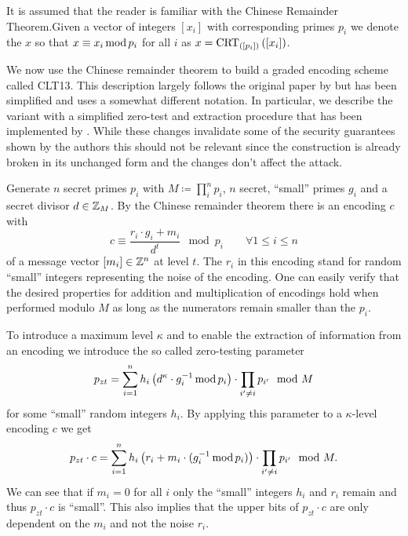 \documentclass[english]{scrartcl}
\theoremstyle{plain}
\theoremstyle{definition}
\begin{document}
    It is assumed that the reader is familiar with the Chinese Remainder Theorem.\@ Given a vector of integers $[x_i]$ with corresponding primes $p_i$ we denote the $x$ so that $x \equiv x_i \operatorname{mod} p_i$ for all $i$ as $x = \operatorname{CRT}_{([p_{i}])}\left(\left[x_i\right]\right)$.

    We now use the Chinese remainder theorem to build a graded encoding scheme called CLT13. This description largely follows the original paper by  but has been simplified and uses a somewhat different notation.
    In particular, we describe the variant with a simplified zero-test and extraction procedure that has been implemented by \citeauthor*{cryptoeprint:2013:183}. While these changes invalidate some of the security guarantees shown by the authors this should not be relevant since the construction is already broken in its unchanged form and the changes don't affect the attack.

    Generate $n$ secret primes $p_i$ with $M \coloneqq \prod_i^n p_i$, $n$ secret, \enquote{small} primes $g_i$ and a secret divisor $d \in \mathbb{Z}_{M}$.
    By the Chinese remainder theorem there is an encoding $c$ with
    \begin{equation}
        c \equiv \frac{r_i \cdot g_i + m_i}{d^t} \mod p_i \qquad \forall 1 \leq i \leq n
    \end{equation}
    of a message vector $[m_i] \in \mathbb{Z}^n$ at level $t$. The $r_i$ in this encoding stand for random \enquote{small} integers representing the noise of the encoding.
    One can easily verify that the desired properties for addition and multiplication of encodings hold when performed modulo $M$ as long as the numerators remain smaller than the $p_i$.

    To introduce a maximum level $\kappa$ and to enable the extraction of information from an encoding we introduce the so called zero-testing parameter
    \begin{equation}\label{eq:pzt}
        p_{zt} = \sum_{i=1}^n h_i \left(d^\kappa \cdot g_i^{-1} \operatorname{mod} p_i\right) \cdot \prod_{i' \neq i} p_{i'} \mod M
    \end{equation}
    for some \enquote{small} random integers $h_i$.
    By applying this parameter to a $\kappa$-level encoding $c$ we get
    \begin{equation*}
        p_{zt} \cdot c = \sum_{i=1}^n h_i \left(r_i + m_i \cdot (g_i^{-1} \operatorname{mod} p_i)\right) \cdot \prod_{i' \neq i} p_{i'} \mod M.
    \end{equation*}
    We can see that if $m_i = 0$ for all $i$ only the \enquote{small} integers $h_i$ and $r_i$ remain and thus $p_{zt} \cdot c$ is \enquote{small}.
    This also implies that the upper bits of $p_{zt} \cdot c$ are only dependent on the $m_i$ and not the noise $r_i$.
\end{document}
